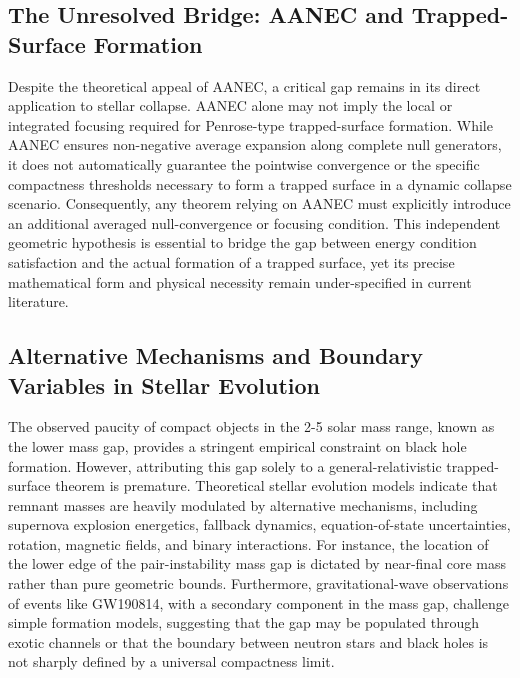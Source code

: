 \documentclass[conference]{IEEEtran}
\begin{document}
\subsection{The Unresolved Bridge: AANEC and Trapped-Surface Formation}
Despite the theoretical appeal of AANEC, a critical gap remains in its direct application to stellar collapse. AANEC alone may not imply the local or integrated focusing required for Penrose-type trapped-surface formation. While AANEC ensures non-negative average expansion along complete null generators, it does not automatically guarantee the pointwise convergence or the specific compactness thresholds necessary to form a trapped surface in a dynamic collapse scenario. Consequently, any theorem relying on AANEC must explicitly introduce an additional averaged null-convergence or focusing condition. This independent geometric hypothesis is essential to bridge the gap between energy condition satisfaction and the actual formation of a trapped surface, yet its precise mathematical form and physical necessity remain under-specified in current literature.

\subsection{Alternative Mechanisms and Boundary Variables in Stellar Evolution}
The observed paucity of compact objects in the 2-5 solar mass range, known as the lower mass gap, provides a stringent empirical constraint on black hole formation. However, attributing this gap solely to a general-relativistic trapped-surface theorem is premature. Theoretical stellar evolution models indicate that remnant masses are heavily modulated by alternative mechanisms, including supernova explosion energetics, fallback dynamics, equation-of-state uncertainties, rotation, magnetic fields, and binary interactions. For instance, the location of the lower edge of the pair-instability mass gap is dictated by near-final core mass rather than pure geometric bounds. Furthermore, gravitational-wave observations of events like GW190814, with a secondary component in the mass gap, challenge simple formation models, suggesting that the gap may be populated through exotic channels or that the boundary between neutron stars and black holes is not sharply defined by a universal compactness limit.~\cite{cite_7a407c865faafd11,cite_f634820e22d7a238}
\end{document}
